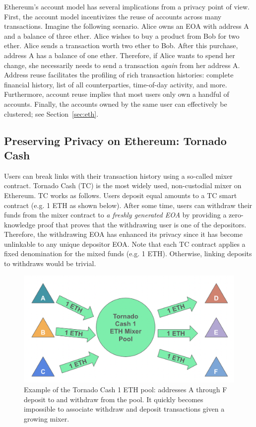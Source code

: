 Ethereum's account model has several implications from a privacy point of view. First, the account model incentivizes the reuse of accounts across many transactions. Imagine the following scenario. Alice owns an EOA with address A and a balance of three ether. Alice wishes to buy a product from Bob for two ether. Alice sends a transaction worth two ether to Bob. After this purchase, address A has a balance of one ether. Therefore, if Alice wants to spend her change, she necessarily needs to send a transaction \emph{again} from her address A. Address reuse facilitates the profiling of rich transaction histories: complete financial history,  list of all counterparties, time-of-day activity, and more. Furthermore, account reuse implies that most users only own a handful of accounts. Finally, the accounts owned by the same user can effectively be clustered; see Section~\ref{sec:eth}. 

\subsection{Preserving Privacy on Ethereum: Tornado Cash}
Users can break links with their transaction history using a so-called mixer contract. Tornado Cash (TC) is the most widely used, non-custodial mixer on Ethereum. TC works as follows. Users deposit equal amounts to a TC smart contract (e.g. 1 ETH as shown below). After some time, users can withdraw their funds from the mixer contract to \emph{a freshly generated EOA} by providing a zero-knowledge proof that proves that the withdrawing user is one of the depositors. Therefore, the withdrawing EOA has enhanced its privacy since it has become unlinkable to any unique depositor EOA. Note that each TC contract applies a fixed denomination for the mixed funds (e.g. 1 ETH). Otherwise, linking deposits to withdraws would be trivial.

\begin{figure}[h!]
\includegraphics[width=\linewidth]{figures/Mixer_WW.png}
\caption{Example of the Tornado Cash 1 ETH pool: addresses A through F deposit to and withdraw from the pool. It quickly becomes impossible to associate withdraw and deposit transactions given a growing mixer.}
\label{fig:demo}
\end{figure}

